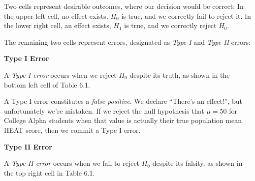\documentclass[
  letterpaper,
  DIV=11,
  numbers=noendperiod]{scrreprt}
\begin{document}
Two cells represent desirable outcomes, where our decision would be
correct: In the upper left cell, no effect exists, \(H_0\) is true, and
we correctly fail to reject it. In the lower right cell, an effect
exists, \(H_1\) is true, and we correctly reject \(H_0\).

The remaining two cells represent errors, designated as \emph{Type I}
and \emph{Type II} errors:

\begin{tcolorbox}[enhanced jigsaw, colframe=quarto-callout-note-color-frame, left=2mm, leftrule=.75mm, rightrule=.15mm, opacityback=0, arc=.35mm, colback=white, bottomrule=.15mm, breakable, toprule=.15mm]
\begin{minipage}[t]{5.5mm}
\textcolor{quarto-callout-note-color}{\faInfo}
\end{minipage}%
\begin{minipage}[t]{\textwidth - 5.5mm}

\vspace{-3mm}\textbf{Type I Error}\vspace{3mm}

A \emph{Type I error} occurs when we reject \(H_0\) despite its truth,
as shown in the bottom left cell of Table 6.1.

\end{minipage}%
\end{tcolorbox}

A Type I error constitutes a \emph{false positive}. We declare ``There's
an effect!'', but unfortunately we're mistaken. If we reject the null
hypothesis that \(\mu = 50\) for College Alpha students when that value
is actually their true population mean HEAT score, then we commit a Type
I error.

\begin{tcolorbox}[enhanced jigsaw, colframe=quarto-callout-note-color-frame, left=2mm, leftrule=.75mm, rightrule=.15mm, opacityback=0, arc=.35mm, colback=white, bottomrule=.15mm, breakable, toprule=.15mm]
\begin{minipage}[t]{5.5mm}
\textcolor{quarto-callout-note-color}{\faInfo}
\end{minipage}%
\begin{minipage}[t]{\textwidth - 5.5mm}

\vspace{-3mm}\textbf{Type II Error}\vspace{3mm}

A \emph{Type II error} occurs when we fail to reject \(H_0\) despite its
falsity, as shown in the top right cell in Table 6.1.

\end{minipage}%
\end{tcolorbox}
\end{document}
